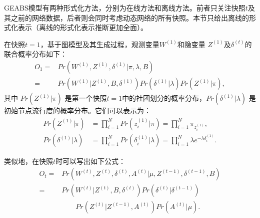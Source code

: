 GEABS模型有两种形式化方法，分别为在线方法和离线方法。前者只关注快照$t$及其之前的网络数据，后者则会同时考虑动态网络的所有快照。本节只给出离线的形式化表示（离线的形式化表示推断更加全面）。

在快照$t=1$，基于图模型及其生成过程，观测变量$W^{(1)}$和隐变量 $Z^{(1)}$及$\delta^{(t)}$的联合概率分布如下：
\begin{align}
O_1 = & Pr(W^{(1)}, Z^{(1)}, \delta^{(1)} |\pi, \lambda, B) \nonumber\\
= & Pr(W^{(1)}|Z^{(1)},B,\delta^{(1)})  Pr(\delta^{(1)}|\lambda) Pr(Z^{(1)}|\pi),
\label{eq:O1}
\end{align}
其中 $Pr(Z^{(1)} | \pi)$ 是第一个快照$t=1$中的社团划分的概率分布，$Pr(\delta^{(1)} | \lambda)$ 是初始节点流行度的概率分布。它们可以表示为：
\begin{align}
Pr (Z^{(1)}|\pi) &= \prod_{i=1}^{N} Pr(z_i^{(1)}|\pi) = \prod_{i=1}^{N} \pi_{z_i^{(1)}}, 
\label{eq:O6}\\
Pr (\delta^{(1)}|\lambda)  &= \prod_{i=1}^{N} Pr(\delta_i^{(1)}|\lambda)
 = \prod_{i=1}^{N} \lambda e^{-\lambda \delta_i^{(1)}}. 
\label{eq:O7}
\end{align}

类似地，在快照$t$时可以写出如下公式：
\begin{align}
O_t = & Pr(W^{(t)}, Z^{(t)}, \delta^{(t)}, A^{(t)} |\mu, Z^{(t-1)}, \delta^{(t-1)}, B) \nonumber\\
= & Pr(W^{(t)}|Z^{(t)},B,\delta^{(t)})  Pr(\delta^{(t)}|\delta^{(t-1)}) \nonumber\\ 
&\qquad Pr(Z^{(t)}|Z^{(t-1)}, A^{(t)}) Pr(A^{(t)} | \mu).
\label{eq:O2}
\end{align}





